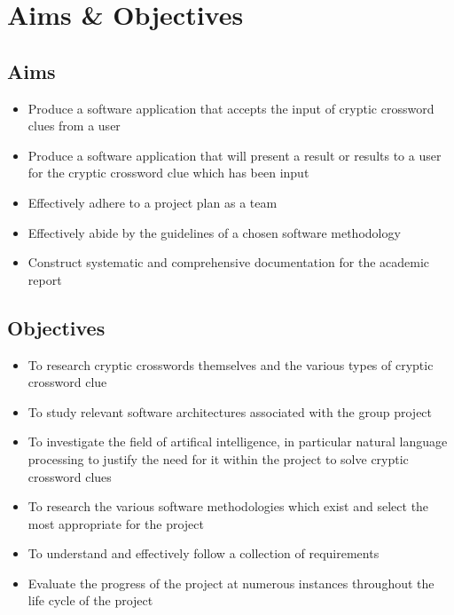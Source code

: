 \section{Aims \& Objectives}

\subsection{Aims}
\begin{itemize}
	\item Produce a software application that accepts the input of cryptic crossword
 clues from a user
	\item Produce a software application that will present a result or results to a
 user for the cryptic crossword clue which has been input
	\item Effectively adhere to a project plan as a team
	\item Effectively abide by the guidelines of a chosen software methodology
	\item Construct systematic and comprehensive documentation for the academic
 report
\end{itemize}

\subsection{Objectives}
\begin{itemize}
	\item To research cryptic crosswords themselves and the various types of cryptic
 crossword clue
	\item To study relevant software architectures associated with the group project
	\item To investigate the field of artifical intelligence, in particular natural
 language processing to justify the need for it within the project to solve cryptic crossword clues
	\item To research the various software methodologies which exist and select the
 most appropriate for the project
	\item To understand and effectively follow a collection of requirements
	\item Evaluate the progress of the project at numerous instances throughout the life cycle of the project
\end{itemize}
